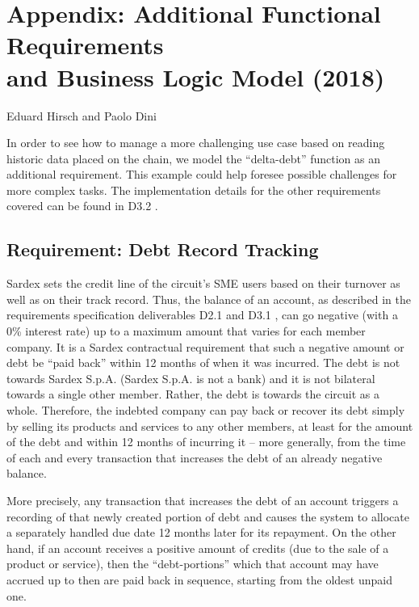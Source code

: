 \chapter*{Appendix: Additional Functional Requirements\\ and Business Logic Model (2018)}
\label{appendix}

\vspace{-1cm}
\begin{center}
Eduard Hirsch and Paolo Dini
\end{center}

In order to see how to manage a more challenging use case based on reading historic data placed on the chain, we model the ``delta-debt'' function as an additional requirement. This example could help foresee possible challenges for more complex tasks. The implementation details for the other requirements covered can be found in D3.2 \cite{INTERLACE_D32}.

\section{Requirement: Debt Record Tracking}

Sardex sets the credit line of the circuit's SME users based on their turnover as well as on their track record. Thus, the balance of an account, as described in the requirements specification deliverables D2.1 and D3.1 \cite{INTERLACE_D21,INTERLACE_D31}, can go negative (with a 0\% interest rate) up to a maximum amount that varies for each member company. It is a Sardex contractual requirement that such a negative amount or debt be ``paid back'' within 12 months of when it was incurred. The debt is not towards Sardex S.p.A. (Sardex S.p.A. is not a bank) and it is not bilateral towards a single other member. Rather, the debt is towards the circuit as a whole. Therefore, the indebted company can pay back or recover its debt simply by selling its products and services to any other members, at least for the amount of the debt and within 12 months of incurring it -- more generally, from the time of each and every transaction that increases the debt of an already negative balance.

More precisely, any transaction that increases the debt of an account triggers a recording of that newly created portion of debt and causes the system to allocate a separately handled due date 12 months later for its repayment. On the other hand, if an account receives a positive amount of credits (due to the sale of a product or service), then the ``debt-portions'' which that account may have accrued up to then are paid back in sequence, starting from the oldest unpaid one.

